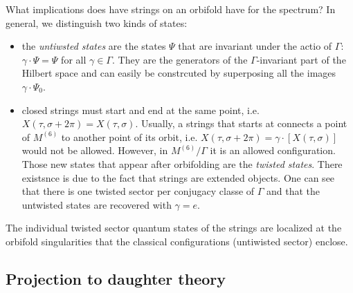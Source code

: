        What implications does have strings on an orbifold have for the spectrum? In general, we distinguish two kinds of states:
        \begin{itemize}
            \item the \emph{untiwsted states} are the states $\Psi$ that are invariant under the actio of $\Gamma$: $\gamma\cdot\Psi=\Psi$ for all $\gamma\in \Gamma$. They are the generators of the $\Gamma$-invariant part of the Hilbert space and can easily be constrcuted by superposing all the images $\gamma\cdot\Psi_0$.
            \item closed strings must start and end at the same point, i.e. $X(\tau,\sigma+2\pi)=X(\tau,\sigma)$. Usually, a strings that starts at connects a point of $M^{(6)}$ to another point of its orbit, i.e. $X(\tau,\sigma+2\pi)=\gamma\cdot[X(\tau,\sigma)]$ would not be allowed. However, in $M^{(6)}/\Gamma$ it is an allowed configuration. Those new states that appear after orbifolding are the \emph{twisted states}. There existsnce is due to the fact that strings are extended objects. One can see that there is one twisted sector per conjugacy classe of $\Gamma$  and that the untwisted states are recovered with $\gamma=e$.
        \end{itemize}
        The individual twisted sector quantum states of the strings are localized at the orbifold singularities that the classical configurations (untiwisted sector) enclose.

    \subsection{Projection to daughter theory}


